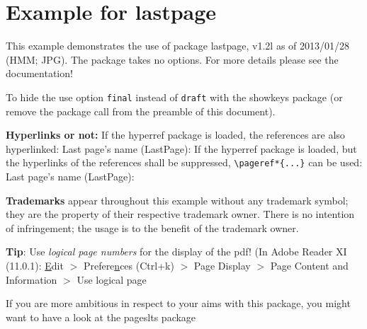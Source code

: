 \documentclass[british]{article}[2007/10/19]%
\begin{document}

\section*{Example for lastpage}

This example demonstrates the use of package\newline
\textsf{lastpage}, v1.2l as of 2013/01/28 (HMM; JPG).\newline
The package takes no options.\newline
For more details please see the documentation!\newline

\noindent \label{keys} To hide the \pageref{keys}{\qquad } use option
\texttt{final} instead of \texttt{draft} with the \textsf{showkeys}
package (or remove the package call from the preamble of
this document).\newline

\textbf{Hyperlinks or not:} If the \textsf{hyperref} package is loaded,
the references are also hyperlinked:\newline
\smallskip
Last page's name (LastPage): \pageref{LastPage}\newline
\noindent If the \textsf{hyperref} package is loaded, but the hyperlinks
of the references shall be suppressed, \verb|\pageref*{...}|
can be used:\newline
\smallskip
Last page's name (LastPage): \pageref*{LastPage}\newline

\textbf{Trademarks} appear throughout this example without any
trademark symbol; they are the property of their respective
trademark owner. There is no intention of infringement; the
usage is to the benefit of the trademark owner.\newline

\textbf{Tip}: Use \textit{logical page numbers} for
the display of the pdf!\newline
(In Adobe Reader XI (11.0.1): \underline{E}dit $>$
Prefere\underline{n}ces (Ctrl+k) $>$ Page Display $>$
Page Content and Information $>$ Use logical page
\newline

If you are more ambitious in respect to your aims with this package,
you might want to have a look at the \textsf{pageslts} package\newline
\makeatletter
\makeatother
\end{document}
